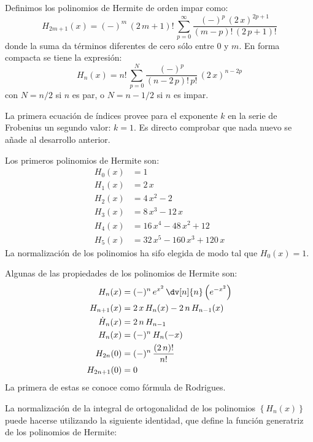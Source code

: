 Definimos los polinomios de Hermite de orden impar como:
\begin{equation}
H_{2m+1} (x) = (-)^{m} \, (2 \, m + 1)! \, \sum_{p=0}^{\infty} \dfrac{(-)^{p} \, (2 \, x)^{2p+1}}{(m-p)! \, (2 \, p + 1)!}
\label{eq:ecuacion_08_61}
\end{equation}
donde la suma da términos diferentes de cero sólo entre $0$ y $m$. En forma compacta se tiene la expresión:
\begin{equation}
\boxed{H_{n}(x) = n! \, \sum_{p=0}^{N} \dfrac{(-)^{p}}{(n - 2 \, p)! \, p!} \, (2 \, x)^{n-2p}}
\label{eq:ecuacion_08_62}
\end{equation}
con $N=n/2$ si $n$ es par, o $N=n-1/2$ si $n$ es impar.
\par
La primera ecuación de índices provee para el exponente $k$ en la serie de Frobenius un segundo valor: $k = 1$. Es directo comprobar que nada nuevo se añade al desarrollo anterior.
\par
Los primeros polinomios de Hermite son:
\begin{align*}
H_{0}(x) &= 1 \\
H_{1}(x) &= 2 \, x \\
H_{2}(x) &= 4 \, x^{2} - 2 \\
H_{3}(x) &= 8 \, x^{3} - 12 \, x \\
H_{4}(x) &= 16 \, x^{4} - 48 \, x^{2} + 12 \\
H_{5}(x) &= 32 \, x^{5} - 160 \, x^{3} + 120 \, x
\end{align*}
La normalización de los polinomios ha sifo elegida de modo tal que $H_{0}(x) = 1$.
\par
Algunas de las propiedades de los polinomios de Hermite son:
\begin{align*}
H_{n} (x) &= (-)^{n} \, e^{x^{2}} \, \dv[n]{n} \left( e^{-x^{2}} \right) \\
H_{n+1} (x) &= 2 \, x \, H_{n} (x) - 2 \, n \, H_{n-1} (x) \\
\dot{H}_{n} (x) &= 2 \, n \, H_{n-1} \\
H_{n} (x) &= (-)^{n} \, H_{n} (-x) \\
H_{2n} (0) &= (-)^{n} \, \dfrac{(2 \, n)!}{n!} \\
H_{2n+1} (0) &= 0
\end{align*}
La primera de estas se conoce como fórmula de Rodrigues.
\par
La normalización de la integral de ortogonalidad de los polinomios $\left\{ H_{n} (x) \right\}$ puede hacerse utilizando la siguiente identidad, que define la función generatriz de los polinomios de Hermite:
